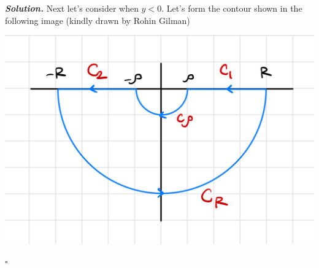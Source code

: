 \documentclass[12pt]{report}
\newenvironment{solution}[1][\it{Solution}]{\textbf{#1. } }{$\square$}
\begin{document}
\begin{solution}
    \noindent
    Next let's consider when $y<0$. Let's form the contour shown in the following image (kindly drawn by Rohin Gilman)
    
    \begin{center}
        \includegraphics[width=.6\textwidth]{figures/2b.jpg}
    \end{center}


\end{solution}
\end{document}
